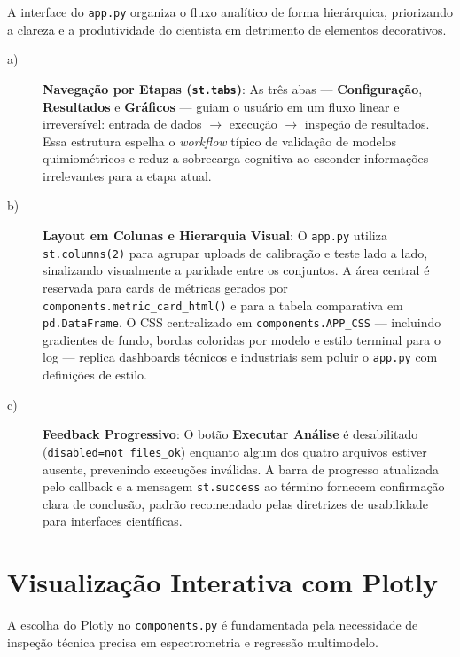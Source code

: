 A interface do \texttt{app.py} organiza o fluxo analítico de forma hierárquica,
priorizando a clareza e a produtividade do cientista em detrimento de elementos
decorativos.

\begin{description}

\item[a)] \textbf{Navegação por Etapas (\texttt{st.tabs})}: As três abas —
\textbf{Configuração}, \textbf{Resultados} e \textbf{Gráficos} — guiam o usuário em um
fluxo linear e irreversível: entrada de dados $\rightarrow$ execução $\rightarrow$
inspeção de resultados. Essa estrutura espelha o \textit{workflow} típico de validação de
modelos quimiométricos e reduz a sobrecarga cognitiva ao esconder informações irrelevantes
para a etapa atual.

\item[b)] \textbf{Layout em Colunas e Hierarquia Visual}: O \texttt{app.py} utiliza
\texttt{st.columns(2)} para agrupar uploads de calibração e teste lado a lado,
sinalizando visualmente a paridade entre os conjuntos. A área central é reservada para
cards de métricas gerados por \texttt{components.metric\_card\_html()} e para a tabela
comparativa em \texttt{pd.DataFrame}. O CSS centralizado em \texttt{components.APP\_CSS}
— incluindo gradientes de fundo, bordas coloridas por modelo e estilo terminal para o
log — replica dashboards técnicos e industriais sem poluir o \texttt{app.py} com
definições de estilo.

\item[c)] \textbf{Feedback Progressivo}: O botão \textbf{Executar Análise} é
desabilitado (\texttt{disabled=not files\_ok}) enquanto algum dos quatro arquivos estiver
ausente, prevenindo execuções inválidas. A barra de progresso atualizada pelo callback e
a mensagem \texttt{st.success} ao término fornecem confirmação clara de conclusão,
padrão recomendado pelas diretrizes de usabilidade para interfaces científicas.

\end{description}

\section{Visualização Interativa com Plotly}

A escolha do Plotly no \texttt{components.py} é fundamentada pela necessidade de
inspeção técnica precisa em espectrometria e regressão multimodelo.

